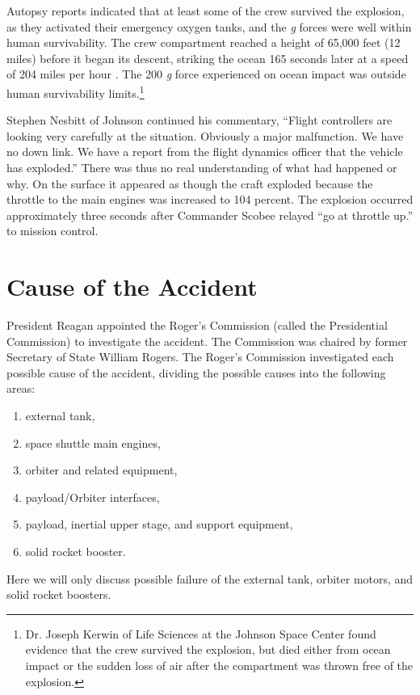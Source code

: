 Autopsy reports indicated that at least some of the crew
survived the explosion, as they activated their emergency
oxygen tanks, and the {\em g} forces were well within human
survivability.
The crew compartment reached a height of 65,000 feet (12
miles) before it began its descent, striking the ocean 165
seconds later at a speed of 204 miles per hour \cite[p.
177]{lewis}.
The 200 {\em g} force experienced on ocean impact was
outside human survivability limits.\footnote{Dr. Joseph
Kerwin of Life Sciences at the Johnson Space Center found
evidence that the crew survived the explosion, but died
either from ocean impact or the sudden loss of air after the
compartment was thrown free of the explosion.}

Stephen Nesbitt of Johnson continued his commentary,
``Flight controllers are looking very carefully at the
situation.
Obviously a major malfunction.
We have no down link.
We have a report from the flight dynamics officer that the
vehicle has exploded.''
There was thus no real understanding of what had happened or
why.
On the surface it appeared as though the craft exploded
because the throttle to the main engines was increased to
104 percent.
The explosion occurred approximately three seconds after
Commander Scobee relayed  ``go at throttle up.'' to mission
control.

\section{Cause of the Accident}

President Reagan appointed the Roger's Commission (called
the Presidential Commission) to investigate the accident. 
The Commission was chaired by former Secretary of State
William Rogers.
The Roger's Commission investigated each possible cause of
the accident,  dividing the possible causes into the
following areas:
\begin{singlespace}
\begin{enumerate}
\item external tank,
\item space shuttle main engines,
\item orbiter and related equipment,
\item payload/Orbiter interfaces,
\item payload, inertial upper stage, and support equipment,
\item solid rocket booster.
\end{enumerate}
\end{singlespace}
Here we will only discuss possible failure of the external
tank, orbiter motors, and solid rocket boosters.

